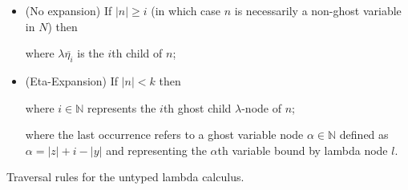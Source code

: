 \documentclass{article}
\theoremstyle{definition}
\newcommand\Nodes{N}%
\begin{document}
\begin{FramedTable}
\begin{itemize}[]
\begin{itemize}
  \item (No expansion) If $|n|\geq i$ (in which case $n$ is necessarily a non-ghost variable in $\Nodes$) then
 
   where $\lambda \overline{\eta_i}$ is the $i$th child of $n$;

\item (Eta-Expansion) If $|n| < k$ then

   where $i \in \mathbb{N}$ represents the $i$th ghost child $\lambda$-node of $n$;


        
     where the last occurrence refers to a ghost variable node $\alpha \in \mathbb{N}$ defined as $\alpha = |z| + i - |y|$ and representing the $\alpha$th variable bound by lambda node $l$.
\end{itemize}

\end{itemize}
\caption{Traversal rules for the untyped lambda calculus.}
 \label{tab:trav_rules}
\end{FramedTable}




\end{document}
